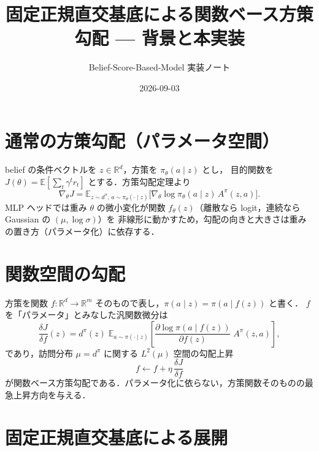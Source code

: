 \documentclass[a4paper,11pt]{article}
\title{固定正規直交基底による関数ベース方策勾配 --- 背景と本実装}
\author{Belief-Score-Based-Model 実装ノート}
\date{2026-09-03}
\begin{document}
\maketitle

\section{通常の方策勾配（パラメータ空間）}

belief の条件ベクトルを $z\in\mathbb{R}^{d}$，方策を $\pi_\theta(a\mid z)$ とし，
目的関数を $J(\theta)=\mathbb{E}\!\left[\sum_t \gamma^t r_t\right]$ とする．方策勾配定理より
\begin{equation}
  \nabla_\theta J
  = \mathbb{E}_{z\sim d^{\pi},\, a\sim\pi_\theta(\cdot\mid z)}
    \bigl[\nabla_\theta \log \pi_\theta(a\mid z)\, A^{\pi}(z,a)\bigr].
  \label{eq:pg}
\end{equation}
MLP ヘッドでは重み $\theta$ の微小変化が関数 $f_\theta(z)$（離散なら logit，連続なら Gaussian の $(\mu,\log\sigma)$）を
非線形に動かすため，勾配の向きと大きさは重みの置き方（パラメータ化）に依存する．

\section{関数空間の勾配}

方策を関数 $f:\mathbb{R}^d\to\mathbb{R}^m$ そのもので表し，$\pi(a\mid z)=\pi(a\mid f(z))$ と書く．
$f$ を「パラメータ」とみなした汎関数微分は
\begin{equation}
  \frac{\delta J}{\delta f}(z)
  = d^{\pi}(z)\;\mathbb{E}_{a\sim\pi(\cdot\mid z)}
    \!\left[\frac{\partial \log\pi(a\mid f(z))}{\partial f(z)}\; A^{\pi}(z,a)\right],
  \label{eq:functional-grad}
\end{equation}
であり，訪問分布 $\mu=d^{\pi}$ に関する $L^2(\mu)$ 空間の勾配上昇
\begin{equation}
  f \leftarrow f + \eta\, \frac{\delta J}{\delta f}
\end{equation}
が関数ベース方策勾配である．パラメータ化に依らない，方策関数そのものの最急上昇方向を与える．

\section{固定正規直交基底による展開}
\end{document}
